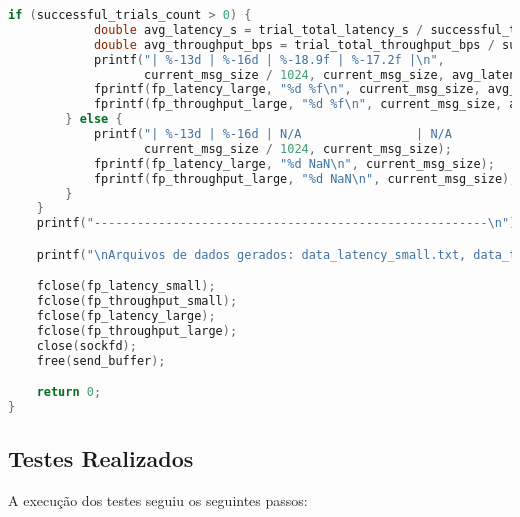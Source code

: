 \begin{lstlisting}[language=C, caption={Código fonte do Testador UDP (tester\_udp.c)}, label={lst:tester_udp}]
        if (successful_trials_count > 0) {
            double avg_latency_s = trial_total_latency_s / successful_trials_count;
            double avg_throughput_bps = trial_total_throughput_bps / successful_trials_count;
            printf("| %-13d | %-16d | %-18.9f | %-17.2f |\n",
                   current_msg_size / 1024, current_msg_size, avg_latency_s, avg_throughput_bps);
            fprintf(fp_latency_large, "%d %f\n", current_msg_size, avg_latency_s);
            fprintf(fp_throughput_large, "%d %f\n", current_msg_size, avg_throughput_bps);
        } else {
            printf("| %-13d | %-16d | N/A                | N/A               |\n",
                   current_msg_size / 1024, current_msg_size);
            fprintf(fp_latency_large, "%d NaN\n", current_msg_size);
            fprintf(fp_throughput_large, "%d NaN\n", current_msg_size);
        }
    }
    printf("-------------------------------------------------------\n");

    printf("\nArquivos de dados gerados: data_latency_small.txt, data_throughput_small.txt, data_latency_large.txt, data_throughput_large.txt\n");

    fclose(fp_latency_small);
    fclose(fp_throughput_small);
    fclose(fp_latency_large);
    fclose(fp_throughput_large);
    close(sockfd);
    free(send_buffer);

    return 0;
}
\end{lstlisting}

\subsection{Testes Realizados}
\label{subsec:testes_exp2}
A execução dos testes seguiu os seguintes passos:

